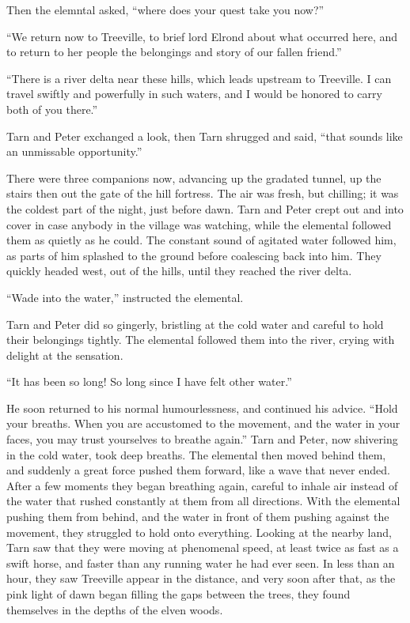 Then the elemntal asked, ``where does your quest take you now?''

``We return now to Treeville, to brief lord Elrond about what occurred here, and to return to her people the belongings and story of our fallen friend.''

``There is a river delta near these hills, which leads upstream to Treeville.  I can travel swiftly and powerfully in such waters, and I would be honored to carry both of you there.''

Tarn and Peter exchanged a look, then Tarn shrugged and said, ``that sounds like an unmissable opportunity.''

There were three companions now, advancing up the gradated tunnel, up the stairs then out the gate of the hill fortress.  The air was fresh, but chilling; it was the coldest part of the night, just before dawn.  Tarn and Peter crept out and into cover in case anybody in the village was watching, while the elemental followed them as quietly as he could.  The constant sound of agitated water followed him, as parts of him splashed to the ground before coalescing back into him.  They quickly headed west, out of the hills, until they reached the river delta.

``Wade into the water,'' instructed the elemental.

Tarn and Peter did so gingerly, bristling at the cold water and careful to hold their belongings tightly.  The elemental followed them into the river, crying with delight at the sensation.

``It has been so long!  So long since I have felt other water.''

He soon returned to his normal humourlessness, and continued his advice.  ``Hold your breaths.  When you are accustomed to the movement, and the water in your faces, you may trust yourselves to breathe again.''  Tarn and Peter, now shivering in the cold water, took deep breaths.  The elemental then moved behind them, and suddenly a great force pushed them forward, like a wave that never ended.  After a few moments they began breathing again, careful to inhale air instead of the water that rushed constantly at them from all directions.  With the elemental pushing them from behind, and the water in front of them pushing against the movement, they struggled to hold onto everything.  Looking at the nearby land, Tarn saw that they were moving at phenomenal speed, at least twice as fast as a swift horse, and faster than any running water he had ever seen.  In less than an hour, they saw Treeville appear in the distance, and very soon after that, as the pink light of dawn began filling the gaps between the trees, they found themselves in the depths of the elven woods.

